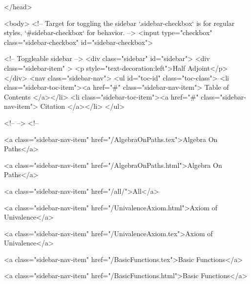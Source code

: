   
</head>




  <body>
    <!-- Target for toggling the sidebar `.sidebar-checkbox` is for regular
     styles, `#sidebar-checkbox` for behavior. -->
<input type="checkbox" class="sidebar-checkbox" id="sidebar-checkbox">

<!-- Toggleable sidebar -->
<div class="sidebar" id="sidebar">
  <div class="sidebar-item" >
    <p style="text-decoration:left">Half Adjoint</p>
  </div>
  <nav class="sidebar-nav">
    <ul id="toc-id" class="toc-class">
  <li class="sidebar-toc-item"><a href="#" class="sidebar-nav-item"> Table of Contents </a></li>
  <li class="sidebar-toc-item"><a href="#" class="sidebar-nav-item"> Citation </a></li>
</ul>


    <!--  -->
    <!-- 
      
    
      
    
      
    
      
        
      
    
      
        
          <a class="sidebar-nav-item" href="/AlgebraOnPaths.tex">Algebra On Paths</a>
        
      
    
      
        
          <a class="sidebar-nav-item" href="/AlgebraOnPaths.html">Algebra On Paths</a>
        
      
    
      
        
          <a class="sidebar-nav-item" href="/all/">All</a>
        
      
    
      
        
          <a class="sidebar-nav-item" href="/UnivalenceAxiom.html">Axiom of Univalence</a>
        
      
    
      
        
          <a class="sidebar-nav-item" href="/UnivalenceAxiom.tex">Axiom of Univalence</a>
        
      
    
      
        
          <a class="sidebar-nav-item" href="/BasicFunctions.tex">Basic Functions</a>
        
      
    
      
        
          <a class="sidebar-nav-item" href="/BasicFunctions.html">Basic Functions</a>
        
